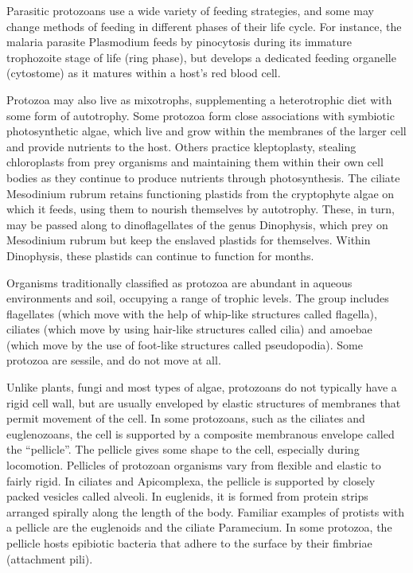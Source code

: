 Parasitic protozoans use a wide variety of feeding strategies, and some may change methods of feeding in different phases of their life cycle. For instance, the malaria parasite Plasmodium feeds by pinocytosis during its immature trophozoite stage of life (ring phase), but develops a dedicated feeding organelle (cytostome) as it matures within a host's red blood cell.

Protozoa may also live as mixotrophs, supplementing a heterotrophic diet with some form of autotrophy. Some protozoa form close associations with symbiotic photosynthetic algae, which live and grow within the membranes of the larger cell and provide nutrients to the host. Others practice kleptoplasty, stealing chloroplasts from prey organisms and maintaining them within their own cell bodies as they continue to produce nutrients through photosynthesis. The ciliate Mesodinium rubrum retains functioning plastids from the cryptophyte algae on which it feeds, using them to nourish themselves by autotrophy. These, in turn, may be passed along to dinoflagellates of the genus Dinophysis, which prey on Mesodinium rubrum but keep the enslaved plastids for themselves. Within Dinophysis, these plastids can continue to function for months.

Organisms traditionally classified as protozoa are abundant in aqueous environments and soil, occupying a range of trophic levels. The group includes flagellates (which move with the help of whip-like structures called flagella), ciliates (which move by using hair-like structures called cilia) and amoebae (which move by the use of foot-like structures called pseudopodia). Some protozoa are sessile, and do not move at all.

Unlike plants, fungi and most types of algae, protozoans do not typically have a rigid cell wall, but are usually enveloped by elastic structures of membranes that permit movement of the cell. In some protozoans, such as the ciliates and euglenozoans, the cell is supported by a composite membranous envelope called the ``pellicle''. The pellicle gives some shape to the cell, especially during locomotion. Pellicles of protozoan organisms vary from flexible and elastic to fairly rigid. In ciliates and Apicomplexa, the pellicle is supported by closely packed vesicles called alveoli. In euglenids, it is formed from protein strips arranged spirally along the length of the body. Familiar examples of protists with a pellicle are the euglenoids and the ciliate Paramecium. In some protozoa, the pellicle hosts epibiotic bacteria that adhere to the surface by their fimbriae (attachment pili).

